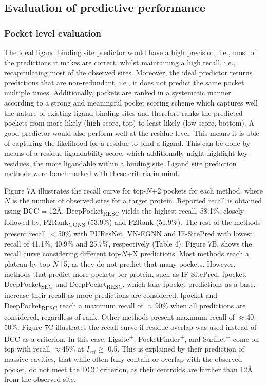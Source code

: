 \subsection{Evaluation of predictive performance}

\subsubsection{Pocket level evaluation}

The ideal ligand binding site predictor would have a high precision, i.e., most of the predictions it makes are correct, whilst maintaining a high recall, i.e., recapitulating most of the observed sites. Moreover, the ideal predictor returns predictions that are non-redundant, i.e., it does not predict the same pocket multiple times. Additionally, pockets are ranked in a systematic manner according to a strong and meaningful pocket scoring scheme which captures well the nature of existing ligand binding sites and therefore ranks the predicted pockets from more likely (high score, top) to least likely (low score, bottom). A good predictor would also perform well at the residue level. This means it is able of capturing the likelihood for a residue to bind a ligand. This can be done by means of a residue ligandability score, which additionally might highlight key residues, the more ligandable within a binding site. Ligand site prediction methods were benchmarked with these criteria in mind.

Figure 7A illustrates the recall curve for top-$N$+2 pockets for each method, where $N$ is the number of observed sites for a target protein. Reported recall is obtained using DCC = 12\AA{}. DeepPocket\textsubscript{RESC} yields the highest recall, 58.1\%, closely followed by, P2Rank\textsubscript{CONS} (53.9\%) and P2Rank (51.9\%). The rest of the methods present recall $<$50\% with PUResNet, VN-EGNN and IF-SitePred with lowest recall of 41.1\%, 40.9\% and 25.7\%, respectively (Table 4). Figure 7B, shows the recall curve considering different top-$N$+X predictions. Most methods reach a plateau by top-$N$+5, as they do not predict that many pockets. However, methods that predict more pockets per protein, such as IF-SitePred, fpocket, DeepPocket\textsubscript{SEG} and DeepPocket\textsubscript{RESC}, which take fpocket predictions as a base, increase their recall as more predictions are considered. fpocket and DeepPocket\textsubscript{RESC} reach a maximum recall of $\approx$90\% when all predictions are considered, regardless of rank. Other methods present maximum recall of $\approx$40-50\%. Figure 7C illustrates the recall curve if residue overlap was used instead of DCC as a criterion. In this case, Ligsite\textsuperscript{+}, PocketFinder\textsuperscript{+}, and Surfnet\textsuperscript{+} come on top with recall $\approx$45\% at $I_{rel} \geq$ 0.5. This is explained by their prediction of massive cavities, that while often fully contain or overlap with the observed pocket, do not meet the DCC criterion, as their centroids are farther than 12\AA{} from the observed site.


